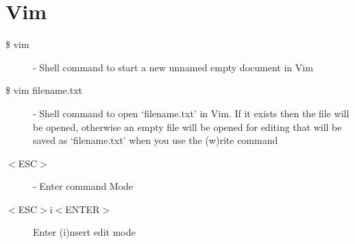 \documentclass[12pt, a4paper, oneside]{book}
\begin{document}
\section{Vim}
\label{cribsheet_vim}
\begin{description}
\item[\$ vim] - Shell command to start a new unnamed empty document in Vim
\item[\$ vim filename.txt] - Shell command to open `filename.txt' in Vim. If it exists then the file will be opened, otherwise an empty file will be opened for editing that will be saved as `filename.txt' when you use the (w)rite command
\item[$<$ESC$>$] - Enter command Mode
\item[$<$ESC$>$i$<$ENTER$>$] Enter (i)nsert edit mode
\end{description}
\end{document}
